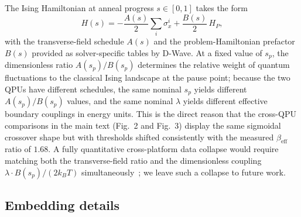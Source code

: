 \documentclass[aps,prapplied,reprint,superscriptaddress,floatfix,nofootinbib]{revtex4-2}
\begin{document}
The Ising Hamiltonian at anneal progress $s \in [0,1]$ takes the form
\begin{equation}
H(s) = -\frac{A(s)}{2}\sum_i \sigma_x^i + \frac{B(s)}{2}\,H_P,
\end{equation}
with the transverse-field schedule $A(s)$ and the problem-Hamiltonian prefactor $B(s)$ provided as solver-specific tables by D-Wave.
At a fixed value of $s_p$, the dimensionless ratio $A(s_p)/B(s_p)$ determines the relative weight of quantum fluctuations to the classical Ising landscape at the pause point; because the two QPUs have different schedules, the same nominal $s_p$ yields different $A(s_p)/B(s_p)$ values, and the same nominal $\lambda$ yields different effective boundary couplings in energy units.
This is the direct reason that the cross-QPU comparisons in the main text (Fig.~2 and Fig.~3) display the same sigmoidal crossover shape but with thresholds shifted consistently with the measured $\beta_\mathrm{eff}$ ratio of $1.68$.
A fully quantitative cross-platform data collapse would require matching both the transverse-field ratio and the dimensionless coupling $\lambda \cdot B(s_p)/(2 k_B T)$ simultaneously~\cite{mehta2025dwave}; we leave such a collapse to future work.

\subsection{Embedding details}
\label{sec:embedding}
\end{document}
